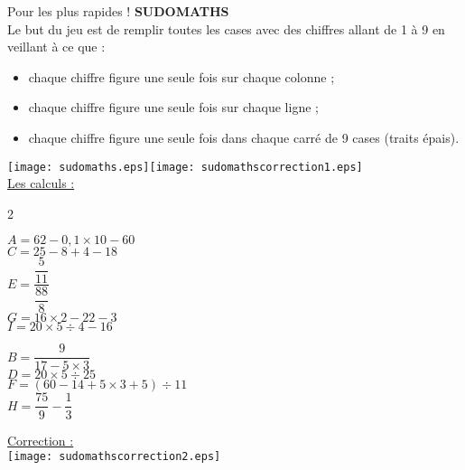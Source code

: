 \documentclass[a4paper,11pt]{article}
\newcommand{\bmul}[1]{\begin{multicols}{#1}}
\newcommand{\emul}{\end{multicols}}
\newcommand{\bi}{\begin{itemize}}
\newcommand{\ei}{\end{itemize}}
\begin{document}
\newpage

\vspace*{0.2cm}

Pour les plus rapides ! \hspace*{4cm} \textbf{SUDOMATHS} \\

Le but du jeu est de remplir toutes les cases avec des chiffres allant de 1 à 9 en veillant à ce que :
\bi
\item chaque chiffre figure une seule fois sur chaque colonne ;
\item chaque chiffre figure une seule fois sur chaque ligne ;
\item  chaque chiffre figure une seule fois dans chaque carré de 9 cases (traits épais).\\
\ei


\texttt{[image: sudomaths.eps]}\hspace*{1.5cm}\texttt{[image: sudomathscorrection1.eps]}\\

\underline{Les calculs :}

\bmul{2}

$A = 62 -0,1 \times 10-60$ \\

$C = 25-8+4-18 $\\

$E =\dfrac{\dfrac{5}{11}}{\dfrac{88}{8}}$\\

$G = 16 \times 2-22-3$\\

$I = 20 \times 5 \div 4 -16$

\columnbreak

$B = \dfrac{9}{17-5 \times 3}	$\\


$D =	20 \times5 \div 25 $\\
	 
	 $F =	(60-14+5 \times 3 +5)\div 11 $\\
	 
	 $H = \dfrac{75}{9}- \dfrac{1}{3}$\\
	 
	 \emul
	 
	 \vspace*{1.5cm}
	\underline{ Correction :} \\
	 \texttt{[image: sudomathscorrection2.eps]}\\
\end{document}
